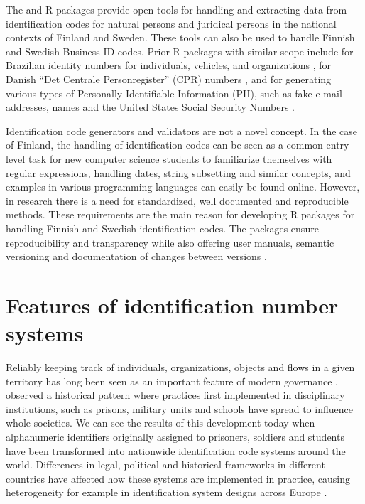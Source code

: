 The  and  R packages provide open tools for handling and extracting data from identification codes for natural persons and juridical persons in the national contexts of Finland and Sweden. These tools can also be used to handle Finnish and Swedish Business ID codes. Prior R packages with similar scope include  for Brazilian identity numbers for individuals, vehicles, and organizations \citep{numbersbr},  for Danish ``Det Centrale Personregister'' (CPR) numbers \citep{cprr}, and  for generating various types of Personally Identifiable Information (PII), such as fake e-mail addresses, names and the United States Social Security Numbers \citep{generator}.

Identification code generators and validators are not a novel concept. In the case of Finland, the handling of identification codes can be seen as a common entry-level task for new computer science students to familiarize themselves with regular expressions, handling dates, string subsetting and similar concepts, and examples in various programming languages can easily be found online. However, in research there is a need for standardized, well documented and reproducible methods. These requirements are the main reason for developing R packages for handling Finnish and Swedish identification codes. The packages ensure reproducibility and transparency while also offering user manuals, semantic versioning and documentation of changes between versions \citep[as outlined by][]{wickham2024}.

\section{Features of identification number systems}\label{features-of-identification-number-systems}

Reliably keeping track of individuals, organizations, objects and flows in a given territory has long been seen as an important feature of modern governance \citep{dodge2005}. \citet[p.~115-120]{foucault7778} observed a historical pattern where practices first implemented in disciplinary institutions, such as prisons, military units and schools have spread to influence whole societies. We can see the results of this development today when alphanumeric identifiers originally assigned to prisoners, soldiers and students have been transformed into nationwide identification code systems around the world. Differences in legal, political and historical frameworks in different countries have affected how these systems are implemented in practice, causing heterogeneity for example in identification system designs across Europe \citep{otjacques2007}.

